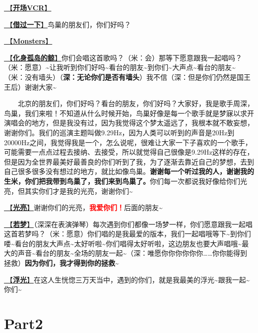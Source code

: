\documentclass[]{ctexbook}
\begin{document}
\hyperref[opening-vcr]{🎥【\textbf{开场VCR}】}

\hyperref[I-will-go-my-way]{🎵【\textbf{借过一下}】}鸟巢的朋友们，你们好吗？

\hyperref[Monsters]{🎵【\textbf{Monsters}】}

\hyperref[hua-shen-gu-dao-de-jing]{🎵【\textbf{化身孤岛的鲸}】}你们会唱这首歌吗？（米：会）那等下愿意跟我一起唱吗？（米：愿意）\textasciitilde 让我听到你们好吗\textasciitilde 看台的朋友\textasciitilde 到你们\textasciitilde 大声点\textasciitilde 看台的朋友\textasciitilde（米：没有墙头）（\textbf{深：无论你们是否有墙头}）我不信（深：但是你们仍然是国王王后）谢谢大家\textasciitilde{}

  北京的朋友们，你们好吗？看台的朋友，你们好吗？大家好，我是歌手周深，鸟巢，我们来啦！不知道从什么时候开始，鸟巢好像是每一个歌手就是梦寐以求开演唱会的地方，但是我没有过，因为我觉得这个梦太遥远了，我根本就不敢妄想，谢谢你们。我们的巡演主题叫做9.29Hz，因为人类可以听到的声音是20Hz到20000Hz之间，我觉得我是一个，怎么说呢，很难让大家一下子喜欢的一个歌手，可能需要一点点过程去接纳、去接受，所以就觉得自己很像是9.29Hz这样的存在，但是因为全世界最美好最善良的你们听到了我，为了逐渐去靠近自己的梦想，去到自己很多很多没有想过的地方，就比如像鸟巢。\textbf{谢谢每一个听过我的人，谢谢我的生米，你们把我带到鸟巢了，我们来到鸟巢了。}你们每一次都说我好像给你们光亮，但其实你们才是我的光亮，谢谢你们\textasciitilde{}

\hyperref[silver-linings]{🎵【\textbf{光亮}】}谢谢你们的光亮，\textbf{\textcolor{red}{我爱你们！}}后面的朋友\textasciitilde{}

\hyperref[ruomeng]{🎵【\textbf{若梦}】}（深深在表演弹琴）每次遇到你们都像一场梦一样，你们愿意跟我一起唱这首若梦吗？（米：愿意）你们唱的是我最爱的版本，我们一起唱哦等下\textasciitilde 到你们喽\textasciitilde 看台的朋友大声点\textasciitilde 太好听啦\textasciitilde 你们唱得太好听啦，这边朋友也要大声唱哦\textasciitilde 最大的声音\textasciitilde 看台的朋友\textasciitilde 全场的朋友一起\textasciitilde（深：唯愿你你你你你你\ldots\ldots 你你能得到拯救）\textbf{因为你们，我才得到你的拯救\textasciitilde{}}

\hyperref[floating-light]{🎵【\textbf{浮光}】}在这人生恍惚三万天当中，遇到的你们，就是我最美的浮光\textasciitilde 跟我一起\textasciitilde 你们\textasciitilde{}

\section{Part2}\label{beijing-20240921-part2}
\end{document}
